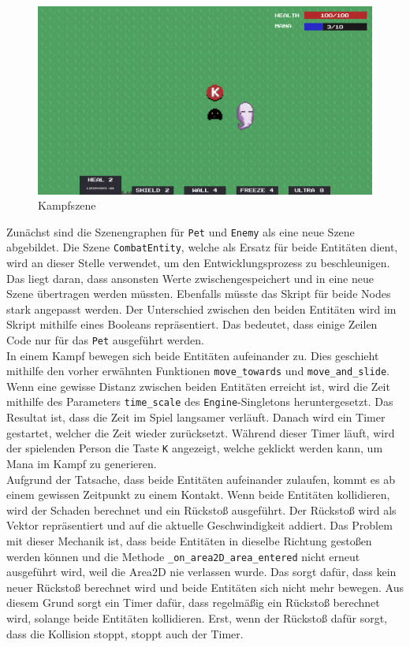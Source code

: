 \begin{figure}[H]
    \centering
    \includegraphics[width=0.8\columnwidth]{figures/screenshots/combat.png}
    \caption{\label{fig:combat}Kampfszene}
\end{figure}

Zunächst sind die Szenengraphen für \texttt{Pet} und \texttt{Enemy} als eine neue Szene abgebildet.
Die Szene \texttt{CombatEntity}, welche als Ersatz für beide Entitäten dient, wird an dieser Stelle verwendet, um den Entwicklungsprozess zu beschleunigen.
Das liegt daran, dass ansonsten Werte zwischengespeichert und in eine neue Szene übertragen werden müssten.
Ebenfalls müsste das Skript für beide Nodes stark angepasst werden.
Der Unterschied zwischen den beiden Entitäten wird im Skript mithilfe eines Booleans repräsentiert.
Das bedeutet, dass einige Zeilen Code nur für das \texttt{Pet} ausgeführt werden.\\

In einem Kampf bewegen sich beide Entitäten aufeinander zu.
Dies geschieht mithilfe den vorher erwähnten Funktionen \texttt{move\_towards} und \texttt{move\_and\_slide}.
Wenn eine gewisse Distanz zwischen beiden Entitäten erreicht ist, wird die Zeit mithilfe des Parameters \texttt{time\_scale} des \texttt{Engine}-Singletons heruntergesetzt\cite{godot-class-engine}.
Das Resultat ist, dass die Zeit im Spiel langsamer verläuft.
Danach wird ein Timer gestartet, welcher die Zeit wieder zurücksetzt.
Während dieser Timer läuft, wird der spielenden Person die Taste \texttt{K} angezeigt, welche geklickt werden kann, um Mana im Kampf zu generieren. \\

Aufgrund der Tatsache, dass beide Entitäten aufeinander zulaufen, kommt es ab einem gewissen Zeitpunkt zu einem Kontakt.
Wenn beide Entitäten kollidieren, wird der Schaden berechnet und ein Rückstoß ausgeführt.
Der Rückstoß wird als Vektor repräsentiert und auf die aktuelle Geschwindigkeit addiert.
Das Problem mit dieser Mechanik ist, dass beide Entitäten in dieselbe Richtung gestoßen werden können und die Methode \texttt{\_on\_area2D\_area\_entered} nicht erneut ausgeführt wird, weil die Area2D nie verlassen wurde.
Das sorgt dafür, dass kein neuer Rückstoß berechnet wird und beide Entitäten sich nicht mehr bewegen.
Aus diesem Grund sorgt ein Timer dafür, dass regelmäßig ein Rückstoß berechnet wird, solange beide Entitäten kollidieren.
Erst, wenn der Rückstoß dafür sorgt, dass die Kollision stoppt, stoppt auch der Timer.\\

